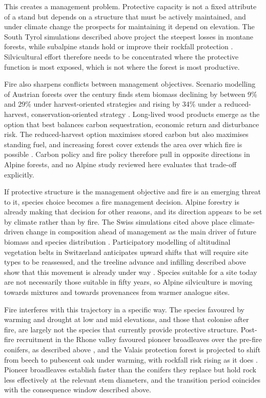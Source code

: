 \documentclass[11pt,a4paper]{article}
\begin{document}
This creates a management problem. Protective capacity is not a fixed attribute of a stand but depends on a structure that must be actively maintained, and under climate change the prospects for maintaining it depend on elevation. The South Tyrol simulations described above project the steepest losses in montane forests, while subalpine stands hold or improve their rockfall protection \citep{hillebrand_contrasting_2023}. Silvicultural effort therefore needs to be concentrated where the protective function is most exposed, which is not where the forest is most productive.

Fire also sharpens conflicts between management objectives. Scenario modelling of Austrian forests over the century finds stem biomass declining by between 9\% and 29\% under harvest-oriented strategies and rising by 34\% under a reduced-harvest, conservation-oriented strategy \citep{jandl_strategies_2018}. Long-lived wood products emerge as the option that best balances carbon sequestration, economic return and disturbance risk. The reduced-harvest option maximises stored carbon but also maximises standing fuel, and increasing forest cover extends the area over which fire is possible \citep{gerberding_mapping_2025}. Carbon policy and fire policy therefore pull in opposite directions in Alpine forests, and no Alpine study reviewed here evaluates that trade-off explicitly.

If protective structure is the management objective and fire is an emerging threat to it, species choice becomes a fire management decision. Alpine forestry is already making that decision for other reasons, and its direction appears to be set by climate rather than by fire. The Swiss simulations cited above place climate-driven change in composition ahead of management as the main driver of future biomass and species distribution \citep{schumacher_relative_2006}. Participatory modelling of altitudinal vegetation belts in Switzerland anticipates upward shifts that will require site types to be reassessed, and the treeline advance and infilling described above show that this movement is already under way \citep{frei_evidence_2023}. Species suitable for a site today are not necessarily those suitable in fifty years, so Alpine silviculture is moving towards mixtures and towards provenances from warmer analogue sites.

Fire interferes with this trajectory in a specific way. The species favoured by warming and drought at low and mid elevations, and those that colonise after fire, are largely not the species that currently provide protective structure. Post-fire recruitment in the Rhone valley favoured pioneer broadleaves over the pre-fire conifers, as described above \citep{moser_potential_2010}, and the Valais protection forest is projected to shift from beech to pubescent oak under warming, with rockfall risk rising as it does \citep{moos_climate_2021}. Pioneer broadleaves establish faster than the conifers they replace but hold rock less effectively at the relevant stem diameters, and the transition period coincides with the consequence window described above.
\end{document}

